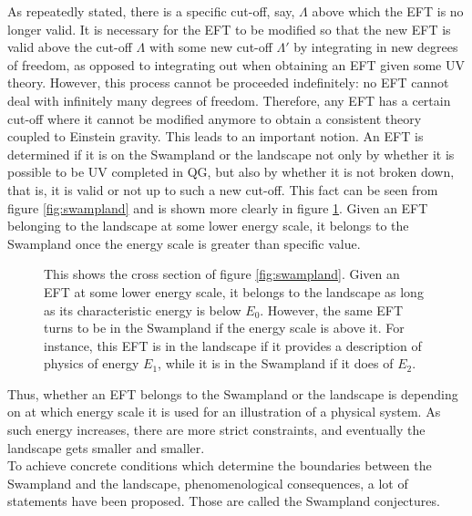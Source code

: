 \indent As repeatedly stated, there is a specific cut-off, say, $\Lambda$ above which the EFT is no longer valid. It is necessary for the EFT to be modified so that the new EFT is valid above the cut-off $\Lambda$ with some new cut-off $\Lambda'$ by integrating in new degrees of freedom, as opposed to integrating out when obtaining an EFT given some UV theory. However, this process cannot be proceeded indefinitely: no EFT cannot deal with infinitely many degrees of freedom. Therefore, any EFT has a certain cut-off where it cannot be modified anymore to obtain a consistent theory coupled to Einstein gravity. This leads to an important notion. An EFT is determined if it is on the Swampland or the landscape not only by whether it is possible to be UV completed in QG, but also by whether it is not broken down, that is, it is valid or not up to such a new cut-off. This fact can be seen from figure \ref{fig:swampland} and is shown more clearly in figure \ref{fig:cross}. Given an EFT belonging to the landscape at some lower energy scale, it belongs to the Swampland once the energy scale is greater than specific value. 

\begin{figure}[h]
    \centering
    \caption{This shows the cross section of figure \ref{fig:swampland}. Given an EFT at some lower energy scale, it belongs to the landscape as long as its characteristic energy is below $E_{0}$. However, the same EFT turns to be in the Swampland if the energy scale is above it. For instance, this EFT is in the landscape if it provides a description of physics of energy $E_{1}$, while it is in the Swampland if it does of $E_{2}$.}
    \label{fig:cross}
\end{figure}
Thus, whether an EFT belongs to the Swampland or the landscape is depending on at which energy scale it is used for an illustration of a physical system. As such energy increases, there are more strict constraints, and eventually the landscape gets smaller and smaller.\\
\indent To achieve concrete conditions which determine the boundaries between the Swampland and the landscape, phenomenological consequences, a lot of statements have been proposed. Those are called the Swampland conjectures.

